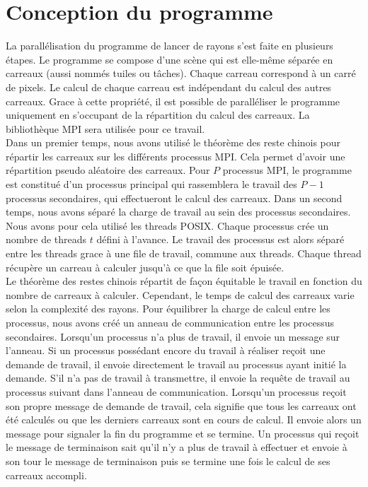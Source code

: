 \section{Conception du programme} %
\label{sec:conception}

La parallélisation du programme de lancer de rayons s'est faite en plusieurs étapes. Le programme se compose d'une scène qui est elle-même séparée en carreaux (aussi nommés tuiles ou tâches). Chaque carreau correspond à un carré de pixels. Le calcul de chaque carreau est indépendant du calcul des autres carreaux. Grace à cette propriété, il est possible de paralléliser le programme uniquement en s'occupant de la répartition du calcul des carreaux. La bibliothèque MPI sera utilisée pour ce travail.\\

Dans un premier temps, nous avons utilisé le théorème des reste chinois pour répartir les carreaux sur les différents processus MPI. Cela permet d'avoir une répartition pseudo aléatoire des carreaux. Pour $P$ processus MPI, le programme est constitué d'un processus principal qui rassemblera le travail des $P-1$ processus secondaires, qui effectueront le calcul des carreaux. Dans un second temps, nous avons séparé la charge de travail au sein des processus secondaires. Nous avons pour cela utilisé les threads POSIX. Chaque processus crée un nombre de threads $t$ défini à l'avance. Le travail des processus est alors séparé entre les threads grace à une file de travail, commune aux threads. Chaque thread récupère un carreau à calculer jusqu'à ce que la file soit épuisée.\\

Le théorème des restes chinois répartit de façon équitable le travail en fonction du nombre de carreaux à calculer. Cependant, le temps de calcul des carreaux varie selon la complexité des rayons. Pour équilibrer la charge de calcul entre les processus, nous avons créé un anneau de communication entre les processus secondaires. Lorsqu'un processus n'a plus de travail, il envoie un message sur l'anneau. Si un processus possédant encore du travail à réaliser reçoit une demande de travail, il envoie directement le travail au processus ayant initié la demande. S'il n'a pas de travail à transmettre, il envoie la requête de travail au processus suivant dans l'anneau de communication. Lorsqu'un processus reçoit son propre message de demande de travail, cela signifie que tous les carreaux ont été calculés ou que les derniers carreaux sont en cours de calcul. Il envoie alors un message pour signaler la fin du programme et se termine. Un processus qui reçoit le message de terminaison sait qu'il n'y a plus de travail à effectuer et envoie à son tour le message de terminaison puis se termine une fois le calcul de ses carreaux accompli.

